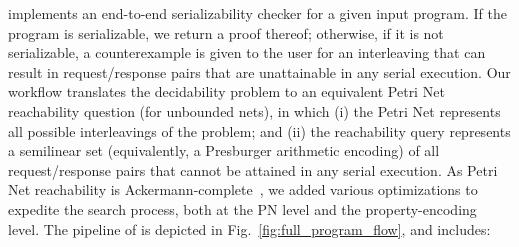 %
%
%
%
\toolname{} implements an end-to-end serializability checker for a given input program. If the program is serializable, we return a proof thereof; otherwise, if it is not serializable, a counterexample is given to the user for an interleaving that can result in request/response pairs that are unattainable in any serial execution.
%
Our workflow translates the decidability problem to an equivalent Petri Net reachability question (for unbounded nets), in which (i) the Petri Net represents all possible interleavings of the problem; and (ii) the reachability query represents a semilinear set (equivalently, a Presburger arithmetic encoding) of all request/response pairs that cannot be attained in any serial execution.
%
As Petri Net reachability is Ackermann-complete~\cite{CzWo22}, we added various optimizations to expedite the search process, both at the PN level and the property-encoding level.
%
The pipeline of \toolname{} is depicted in Fig.~\ref{fig:full_program_flow}, and includes:
 

